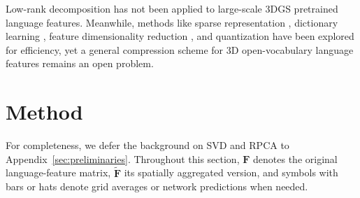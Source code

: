 \documentclass[10pt,twocolumn,letterpaper]{article}
\begin{document}
Low-rank decomposition has not been applied to large-scale 3DGS pretrained language features. Meanwhile, methods like sparse representation \cite{li2025langsplatv2}, dictionary learning \cite{wu2024opengaussian}, feature dimensionality reduction \cite{cheng2024occamslgssimpleapproach}, and quantization \cite{drsplat25} have been explored for efficiency, yet a general compression scheme for 3D open-vocabulary language features remains an open problem.

\section{Method}
\label{sec:method}
For completeness, we defer the background on SVD and RPCA to Appendix~\ref{sec:preliminaries}. Throughout this section, $\mathbf{F}$ denotes the original language-feature matrix, $\tilde{\mathbf{F}}$ its spatially aggregated version, and symbols with bars or hats denote grid averages or network predictions when needed.
\end{document}
